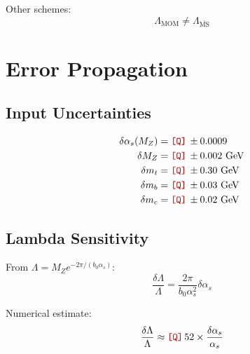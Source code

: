 \documentclass[11pt,a4paper]{article}
\newcommand{\Qnum}[1]{\textcolor{red!70!black}{\texttt{[Q]}}\,#1}
\theoremstyle{definition}
\begin{document}
Other schemes:
\begin{equation}
\label{eq:app-lambda-other}
\Lambda_{\text{MOM}} \neq \Lambda_{\overline{\text{MS}}}
\end{equation}

\section{Error Propagation}
\label{app:errors}

\subsection{Input Uncertainties}
\label{subsec:input-errors}

\begin{quarantinebox}
\begin{align}
\label{eq:app-err-alpha}
\delta\alpha_s(M_Z) &= \Qnum{\pm 0.0009} \\
\label{eq:app-err-mz}
\delta M_Z &= \Qnum{\pm 0.002} \text{ GeV} \\
\label{eq:app-err-mt}
\delta m_t &= \Qnum{\pm 0.30} \text{ GeV} \\
\label{eq:app-err-mb}
\delta m_b &= \Qnum{\pm 0.03} \text{ GeV} \\
\label{eq:app-err-mc}
\delta m_c &= \Qnum{\pm 0.02} \text{ GeV}
\end{align}
\end{quarantinebox}

\subsection{Lambda Sensitivity}
\label{subsec:lambda-sensitivity}

From $\Lambda = M_Z e^{-2\pi/(b_0\alpha_s)}$:
\begin{equation}
\label{eq:app-lambda-sens}
\frac{\delta\Lambda}{\Lambda} = \frac{2\pi}{b_0\alpha_s^2}\delta\alpha_s
\end{equation}

Numerical estimate:
\begin{equation}
\label{eq:app-lambda-sens-num}
\frac{\delta\Lambda}{\Lambda} \approx \Qnum{52} \times \frac{\delta\alpha_s}{\alpha_s}
\end{equation}
\end{document}
